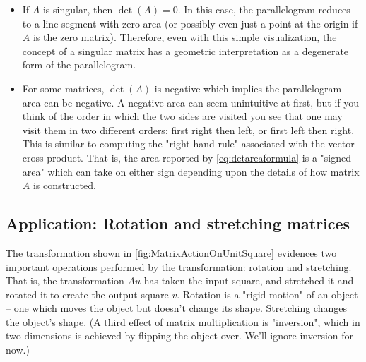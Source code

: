 \documentclass[onefignum,onetabnum]{siamart190516}
\begin{document}
\begin{itemize}
	\item If $A$ is singular, then $\det(A) = 0$.  In this case, the parallelogram
	reduces to a line segment with zero area (or possibly even just a point at the origin
	if $A$ is the zero matrix).  Therefore, even with this simple visualization, the concept
	of a singular matrix has a geometric interpretation as a degenerate form of the parallelogram.
	
	\item For some matrices, $\det(A)$ is negative which implies the
	parallelogram area can be negative.  A negative area can seem unintuitive at
	first, but if you think of the order in which the two sides
	are visited you see that one may visit them in two different
	orders:  first right then left, or first left then right.  This
	is similar to computing the "right hand rule" associated with
	the vector cross product.  That is, the area reported by 
	\cref{eq:detareaformula} is a "signed area" which can take on
	either sign depending upon the details of how 
	matrix $A$ is constructed.
\end{itemize}


\subsection{Application:  Rotation and stretching matrices}
The transformation shown in \cref{fig:MatrixActionOnUnitSquare} evidences two important
operations performed by the transformation:  rotation and stretching.
That is, the transformation $A u$ has taken the input square, and
stretched it and rotated it to create the output square $v$.
Rotation is a "rigid motion" of an object -- one which moves
the object but doesn't change its shape.  Stretching changes the
object's shape.  (A third effect of matrix multiplication is "inversion", 
which in two dimensions is achieved by flipping the object over.  We'll
ignore inversion for now.)
\end{document}
